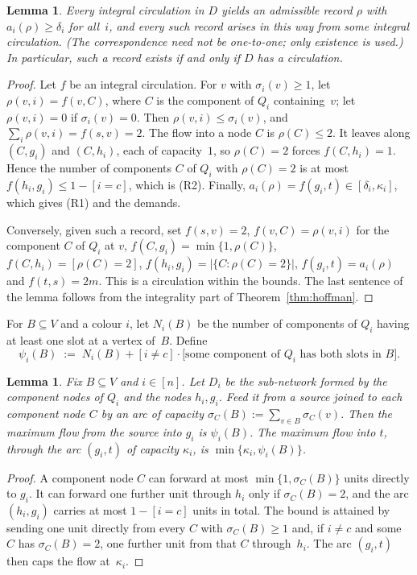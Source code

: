 \documentclass[11pt]{amsart}
\newtheorem{lemma}[theorem]{Lemma}
\theoremstyle{definition}
\theoremstyle{remark}
\begin{document}
\begin{lemma}\label{lem:flow-record}
Every integral circulation in $D$ yields an admissible record $\rho$ with
$a_i(\rho)\ge\delta_i$ for all~$i$, and every such record arises in this way from some
integral circulation. (The correspondence need not be one-to-one; only existence is used.) In particular, such a record exists if and only if $D$
has a circulation.
\end{lemma}

\begin{proof}
Let $f$ be an integral circulation. For $v$ with $\sigma_i(v)\ge1$, let $\rho(v,i)=f(v,C)$,
where $C$ is the component of $Q_i$ containing~$v$; let $\rho(v,i)=0$ if $\sigma_i(v)=0$. Then
$\rho(v,i)\le\sigma_i(v)$, and $\sum_i\rho(v,i)=f(s,v)=2$. The flow into a node $C$ is
$\rho(C)\le2$. It leaves along $(C,g_i)$ and $(C,h_i)$, each of capacity~$1$, so
$\rho(C)=2$ forces $f(C,h_i)=1$. Hence the number of components $C$ of $Q_i$ with
$\rho(C)=2$ is at most $f(h_i,g_i)\le 1-[i=c]$, which is (R2). Finally,
$a_i(\rho)=f(g_i,t)\in[\delta_i,\kappa_i]$, which gives (R1) and the demands.

Conversely, given such a record, set
$f(s,v)=2$, $f(v,C)=\rho(v,i)$ for the component $C$ of $Q_i$ at $v$,
$f(C,g_i)=\min\{1,\rho(C)\}$, $f(C,h_i)=[\rho(C)=2]$,
$f(h_i,g_i)=|\{C:\rho(C)=2\}|$, $f(g_i,t)=a_i(\rho)$ and $f(t,s)=2m$.
This is a circulation within the bounds. The last sentence of the lemma follows from the
integrality part of Theorem~\ref{thm:hoffman}.
\end{proof}

For $B\subseteq V$ and a colour $i$, let $N_i(B)$ be the number of components of $Q_i$ having
at least one slot at a vertex of~$B$. Define
\[
\psi_i(B)\;:=\;N_i(B)+[i\ne c]\cdot\bigl[\text{some component of $Q_i$ has both slots in $B$}\bigr].
\]

\begin{lemma}\label{lem:psi}
Fix $B\subseteq V$ and $i\in[n]$. Let $D_i$ be the sub-network formed by the component nodes
of $Q_i$ and the nodes $h_i,g_i$. Feed it from a source joined to each component node $C$ by
an arc of capacity $\sigma_C(B):=\sum_{v\in B}\sigma_C(v)$. Then the maximum flow from the
source into $g_i$ is $\psi_i(B)$. The maximum flow into $t$, through the arc $(g_i,t)$ of
capacity $\kappa_i$, is $\min\{\kappa_i,\psi_i(B)\}$.
\end{lemma}

\begin{proof}
A component node $C$ can forward at most $\min\{1,\sigma_C(B)\}$ units directly to $g_i$. It
can forward one further unit through $h_i$ only if $\sigma_C(B)=2$, and the arc $(h_i,g_i)$
carries at most $1-[i=c]$ units in total. The bound is attained by sending one unit directly
from every $C$ with $\sigma_C(B)\ge1$ and, if $i\ne c$ and some $C$ has $\sigma_C(B)=2$, one
further unit from that $C$ through~$h_i$. The arc $(g_i,t)$ then caps the flow at~$\kappa_i$.
\end{proof}
\end{document}
